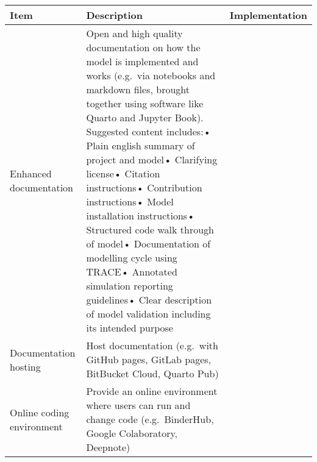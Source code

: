 \begin{longtable}[]{@{}lll@{}}
\toprule
\begin{minipage}[b]{0.30\columnwidth}\raggedright
Item\strut
\end{minipage} & \begin{minipage}[b]{0.30\columnwidth}\raggedright
Description\strut
\end{minipage} & \begin{minipage}[b]{0.30\columnwidth}\raggedright
Implementation\strut
\end{minipage}\tabularnewline
\midrule
\endhead
\begin{minipage}[t]{0.30\columnwidth}\raggedright
Enhanced documentation\strut
\end{minipage} & \begin{minipage}[t]{0.30\columnwidth}\raggedright
Open and high quality documentation on how the model is implemented and
works (e.g.~via notebooks and markdown files, brought together using
software like Quarto and Jupyter Book). Suggested content includes:•
Plain english summary of project and model• Clarifying license• Citation
instructions• Contribution instructions• Model installation
instructions• Structured code walk through of model• Documentation of
modelling cycle using TRACE• Annotated simulation reporting guidelines•
Clear description of model validation including its intended
purpose\strut
\end{minipage} & \begin{minipage}[t]{0.30\columnwidth}\raggedright
\strut
\end{minipage}\tabularnewline
\begin{minipage}[t]{0.30\columnwidth}\raggedright
Documentation hosting\strut
\end{minipage} & \begin{minipage}[t]{0.30\columnwidth}\raggedright
Host documentation (e.g.~with GitHub pages, GitLab pages, BitBucket
Cloud, Quarto Pub)\strut
\end{minipage} & \begin{minipage}[t]{0.30\columnwidth}\raggedright
\strut
\end{minipage}\tabularnewline
\begin{minipage}[t]{0.30\columnwidth}\raggedright
Online coding environment\strut
\end{minipage} & \begin{minipage}[t]{0.30\columnwidth}\raggedright
Provide an online environment where users can run and change code
(e.g.~BinderHub, Google Colaboratory, Deepnote)\strut

\end{minipage}
\end{longtable}
